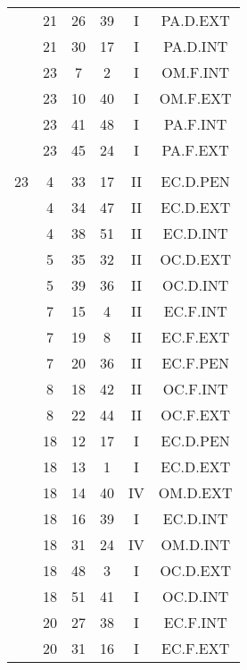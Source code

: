 \documentclass[12pt, a4paper]{article}
\begin{document}
\begin{multicols}{3}
{\begin{tabular}{c c c c c c}
	 	 	 	 & 21 & 26 & 39 & I & PA.D.EXT\\%
	 	 	 	 & 21 & 30 & 17 & I & PA.D.INT\\%
	 	 	 	 & 23 & 7 & 2 & I & OM.F.INT\\%
	 	 	 	 & 23 & 10 & 40 & I & OM.F.EXT\\%
	 	 	 	 & 23 & 41 & 48 & I & PA.F.INT\\%
	 	 	 	 & 23 & 45 & 24 & I & PA.F.EXT\\%
	 	 	 	 & & & & & \\%
	 	 	 	23 & 4 & 33 & 17 & II & EC.D.PEN\\%
	 	 	 	 & 4 & 34 & 47 & II & EC.D.EXT\\%
	 	 	 	 & 4 & 38 & 51 & II & EC.D.INT\\%
	 	 	 	 & 5 & 35 & 32 & II & OC.D.EXT\\%
	 	 	 	 & 5 & 39 & 36 & II & OC.D.INT\\%
	 	 	 	 & 7 & 15 & 4 & II & EC.F.INT\\%
	 	 	 	 & 7 & 19 & 8 & II & EC.F.EXT\\%
	 	 	 	 & 7 & 20 & 36 & II & EC.F.PEN\\%
	 	 	 	 & 8 & 18 & 42 & II & OC.F.INT\\%
	 	 	 	 & 8 & 22 & 44 & II & OC.F.EXT\\%
	 	 	 	 & 18 & 12 & 17 & I & EC.D.PEN\\%
	 	 	 	 & 18 & 13 & 1 & I & EC.D.EXT\\%
	 	 	 	 & 18 & 14 & 40 & IV & OM.D.EXT\\%
	 	 	 	 & 18 & 16 & 39 & I & EC.D.INT\\%
	 	 	 	 & 18 & 31 & 24 & IV & OM.D.INT\\%
	 	 	 	 & 18 & 48 & 3 & I & OC.D.EXT\\%
	 	 	 	 & 18 & 51 & 41 & I & OC.D.INT\\%
	 	 	 	 & 20 & 27 & 38 & I & EC.F.INT\\%
	 	 	 	 & 20 & 31 & 16 & I & EC.F.EXT\\%
	 	 \end{tabular}
 	}
\end{multicols}
\end{document}
